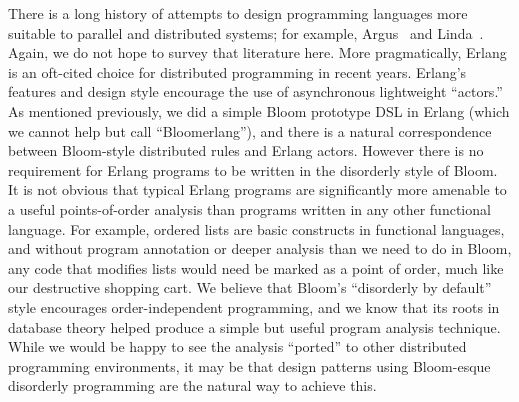 There is a long history of attempts to design programming languages more
suitable to parallel and distributed systems; for example, Argus~\cite{argus}
and Linda~\cite{linda}.  Again, we do not hope to survey that literature here.
More pragmatically, Erlang is an oft-cited choice for distributed programming in
recent years.  Erlang's features and design style encourage the use of
asynchronous lightweight ``actors.''  As mentioned previously, we did a simple
Bloom prototype DSL in Erlang (which we cannot help but call ``Bloomerlang''),
and there is a natural correspondence between Bloom-style distributed rules and
Erlang actors.  However there is no requirement for Erlang programs to be
written in the disorderly style of Bloom. It is not obvious that typical Erlang
programs are significantly more amenable to a useful points-of-order analysis
than programs written in any other functional language.  For example, ordered
lists are basic constructs in functional languages, and without program
annotation or deeper analysis than we need to do in Bloom, any code that
modifies lists would need be marked as a point of order, much like our
destructive shopping cart.  We believe that Bloom's ``disorderly by default''
style encourages order-independent programming, and we know that its roots in
database theory helped produce a simple but useful program analysis
technique. While we would be happy to see the analysis ``ported'' to other
distributed programming environments, it may be that design patterns using
Bloom-esque disorderly programming are the natural way to achieve this.
